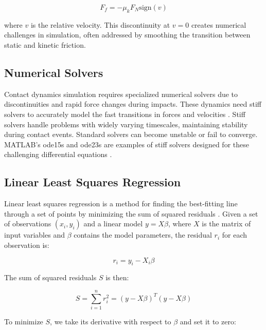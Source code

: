 \begin{equation}
\label{eq:kinetic_friction}
F_f = -\mu_k F_N \text{sign}(v)
\end{equation}

where \(v\) is the relative velocity. This discontinuity at \(v=0\) creates numerical challenges in simulation, often addressed by smoothing the transition between static and kinetic friction.

\subsection{Numerical Solvers}
\label{sec:numerical_solvers}

Contact dynamics simulation requires specialized numerical solvers due to discontinuities and rapid force changes during impacts. These dynamics need stiff solvers to accurately model the fast transitions in forces and velocities \cite{stiff_contact_ODE_1}\cite{stiff_contact_ODE_2}. Stiff solvers handle problems with widely varying timescales, maintaining stability during contact events. Standard solvers can become unstable or fail to converge. MATLAB's ode15s and ode23s are examples of stiff solvers designed for these challenging differential equations \cite{MATLAB_ODE}.


\subsection{Linear Least Squares Regression}
Linear least squares regression is a method for finding the best-fitting line through a set of points by minimizing the sum of squared residuals \cite{numerical_methods}. Given a set of observations \((x_i, y_i)\) and a linear model \(y = X\beta\), where \(X\) is the matrix of input variables and \(\beta\) contains the model parameters, the residual \(r_i\) for each observation is:

\begin{equation}
\label{eq:residual}
r_i = y_i - X_i\beta
\end{equation}

The sum of squared residuals \(S\) is then:

\begin{equation}
\label{eq:sum_squared_residuals} 
S = \sum_{i=1}^n r_i^2 = (y - X\beta)^T(y - X\beta)
\end{equation}

To minimize \(S\), we take its derivative with respect to \(\beta\) and set it to zero:

